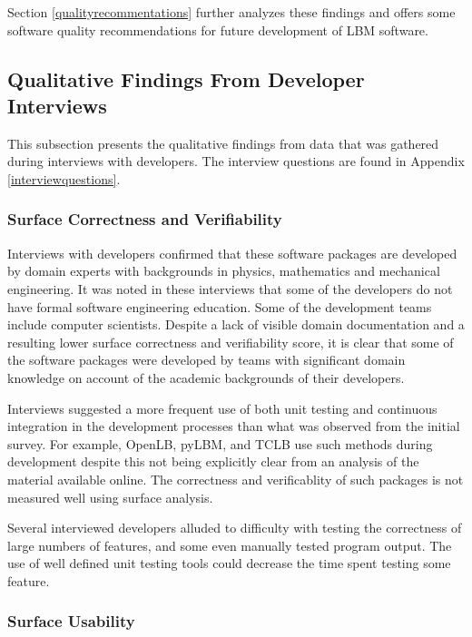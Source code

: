 \documentclass[12pt, notitlepage]{article}
\begin{document}
Section \ref{qualityrecommentations} further analyzes these findings and offers some software quality recommendations for future development of LBM software.

\subsection{Qualitative Findings From Developer Interviews}\label{interviewresults}

This subsection presents the qualitative findings from data that was gathered during interviews with developers. The interview questions are found in Appendix \ref{interviewquestions}.

\subsubsection{Surface Correctness and Verifiability}

Interviews with developers confirmed that these software packages are developed by domain experts with backgrounds in physics, mathematics and mechanical engineering. It was noted in these interviews that some of the developers do not have formal software engineering education. Some of the development teams include computer scientists. Despite a lack of visible domain documentation and a resulting lower surface correctness and verifiability score, it is clear that some of the software packages were developed by teams with significant domain knowledge on account of the academic backgrounds of their developers. 

Interviews suggested a more frequent use of both unit testing and continuous integration in the development processes than what was observed from the initial survey. For example, OpenLB, pyLBM, and TCLB use such methods during development despite this not being explicitly clear from an analysis of the material available online. The correctness and verificablity of such packages is not measured well using surface analysis.

Several interviewed developers alluded to difficulty with testing the correctness of large numbers of features, and some even manually tested program output. The use of well defined unit testing tools could decrease the time spent testing some feature.

\subsubsection{Surface Usability}
\end{document}
